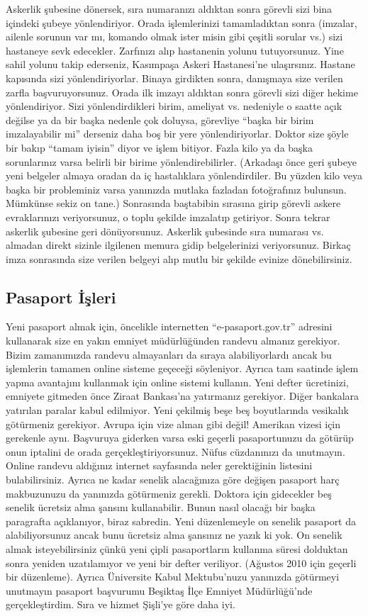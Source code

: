\documentclass[12pt]{article}
\begin{document}
Askerlik şubesine dönersek, sıra numaranızı aldıktan sonra görevli sizi bina içindeki şubeye yönlendiriyor. Orada işlemlerinizi tamamladıktan sonra (imzalar, ailenle sorunun var mı, komando olmak ister misin gibi çeşitli sorular vs.) sizi hastaneye sevk edecekler. Zarfınızı alıp hastanenin yolunu tutuyorsunuz. Yine sahil yolunu takip ederseniz, Kasımpaşa Askeri Hastanesi’ne ulaşırsınız. Hastane kapısında sizi yönlendiriyorlar. 
Binaya girdikten sonra, danışmaya size verilen zarfla başvuruyorsunuz. Orada ilk imzayı aldıktan sonra görevli sizi diğer hekime yönlendiriyor. Sizi yönlendirdikleri birim, ameliyat vs. nedeniyle o saatte açık değilse ya da bir başka nedenle çok doluysa, görevliye “başka bir birim imzalayabilir mi” derseniz daha boş bir yere yönlendiriyorlar. Doktor size şöyle bir bakıp “tamam iyisin” diyor ve işlem bitiyor. Fazla kilo ya da başka sorunlarınız varsa belirli bir birime yönlendirebilirler. (Arkadaşı önce geri şubeye yeni belgeler almaya oradan da iç hastalıklara yönlendirdiler. Bu yüzden kilo veya başka bir probleminiz varsa yanınızda mutlaka fazladan fotoğrafınız bulunsun. Mümkünse sekiz on tane.) Sonrasında baştabibin sırasına girip görevli askere evraklarınızı veriyorsunuz, o toplu şekilde imzalatıp getiriyor. Sonra tekrar askerlik şubesine geri dönüyorsunuz. Askerlik şubesinde sıra numarası vs. almadan direkt sizinle ilgilenen memura gidip belgelerinizi veriyorsunuz. Birkaç imza sonrasında size verilen belgeyi alıp mutlu bir şekilde evinize dönebilirsiniz.


\subsection{Pasaport İşleri}
Yeni pasaport almak için, öncelikle internetten “e-pasaport.gov.tr” adresini kullanarak size en yakın emniyet müdürlüğünden randevu almanız gerekiyor. Bizim zamanımızda randevu almayanları da sıraya alabiliyorlardı ancak bu işlemlerin tamamen online sisteme geçeceği söyleniyor. Ayrıca tam saatinde işlem yapma avantajını kullanmak için online sistemi kullanın. Yeni defter ücretinizi, emniyete gitmeden önce Ziraat Bankası’na yatırmanız gerekiyor. Diğer bankalara yatırılan paralar kabul edilmiyor. Yeni çekilmiş beşe beş boyutlarında vesikalık götürmeniz gerekiyor. Avrupa için vize alınan gibi değil! Amerikan vizesi için gerekenle aynı. Başvuruya giderken varsa eski geçerli pasaportunuzu da götürüp onun iptalini de orada gerçekleştiriyorsunuz. Nüfus cüzdanınızı da unutmayın. Online randevu aldığınız internet sayfasında neler gerektiğinin listesini bulabilirsiniz. Ayrıca ne kadar senelik alacağınıza göre değişen pasaport harç makbuzunuzu da yanınızda götürmeniz gerekli. Doktora için gidecekler beş senelik ücretsiz alma şansını kullanabilir. Bunun nasıl olacağı bir başka paragrafta açıklanıyor, biraz sabredin. Yeni düzenlemeyle on senelik pasaport da alabiliyorsunuz ancak bunu ücretsiz alma şansınız ne yazık ki yok. On senelik almak isteyebilirsiniz çünkü yeni çipli pasaportların kullanma süresi dolduktan sonra yeniden uzatılamıyor ve yeni bir defter veriliyor. (Ağustos 2010 için geçerli bir düzenleme). Ayrıca Üniversite Kabul Mektubu’nuzu yanınızda götürmeyi unutmayın pasaport başvurumu Beşiktaş İlçe Emniyet Müdürlüğü’nde gerçekleştirdim. Sıra ve hizmet Şişli’ye göre daha iyi.
\end{document}
